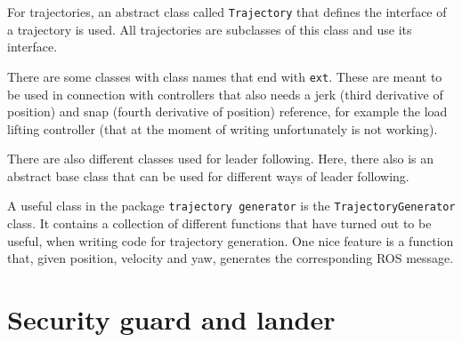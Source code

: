 \documentclass[titlepage,11pt,a4paper]{article}
\begin{document}
For trajectories, an abstract class called \texttt{Trajectory} that
defines the interface of a trajectory is used. All trajectories are
subclasses of this class and use its interface.

There are some classes with class names that end with
\texttt{\textunderscore ext}. These are meant to be used in connection
with controllers that also needs a jerk (third derivative of position)
and snap (fourth derivative of position) reference, for example the load
lifting controller (that at the moment of writing unfortunately is not
working).

There are also different classes used for leader following. Here,
there also is an abstract base class that can be used for different
ways of leader following.

A useful class in the package \texttt{trajectory\textunderscore
  generator} is the \texttt{TrajectoryGenerator} class. It contains a
collection of different functions that have turned out to be useful,
when writing code for trajectory generation. One nice feature is a
function that, given position, velocity and yaw, generates the
corresponding ROS message.


\section{Security guard and lander}
\label{sec:security_guard}
\end{document}
